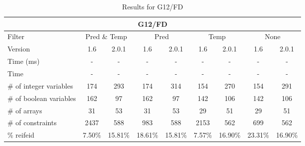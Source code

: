 \documentclass{standalone}
\begin{document}
\begin{table}[H]
\footnotesize
\centering
\begin{tabular}{lc|c|c|c|c|c|c|c}
\multicolumn{9}{c}{G12/FD} \\ 
\hline\hline Filter & \multicolumn{2}{c|}{Pred \& Temp} &\multicolumn{2}{c|}{Pred}  & \multicolumn{2}{c|}{Temp} & \multicolumn{2}{c}{None} \\ 
\hline Version & 1.6 & 2.0.1 & 1.6 & 2.0.1 & 1.6 & 2.0.1 & 1.6 & 2.0.1 \\ 
Time (ms)               & - & - & - & - & - & - & - & - \\
Time                    & - & - & - & - & - & - & - & - \\ 
\# of integer variables & 174 & 293 & 174 & 314 & 154 & 270 & 154 & 291 \\ 
\# of boolean variables & 162 & 97 & 162 & 97 & 142 & 106 & 142 & 106 \\ 
\# of arrays            & 31 & 53 & 31 & 53 & 29 & 51 & 29 & 51 \\ 
\# of constraints       & 2437 & 588 & 983 & 588 & 2153 & 562 & 699 & 562 \\ 
\% reifeid               & 7.50\% & 15.81\% & 18.61\% & 15.81\% & 7.57\% & 16.90\% &23.31\% & 16.90\% \\ 
\end{tabular}
\caption{Results for G12/FD}\label{tab:res_g12}
\end{table} 
\end{document}
